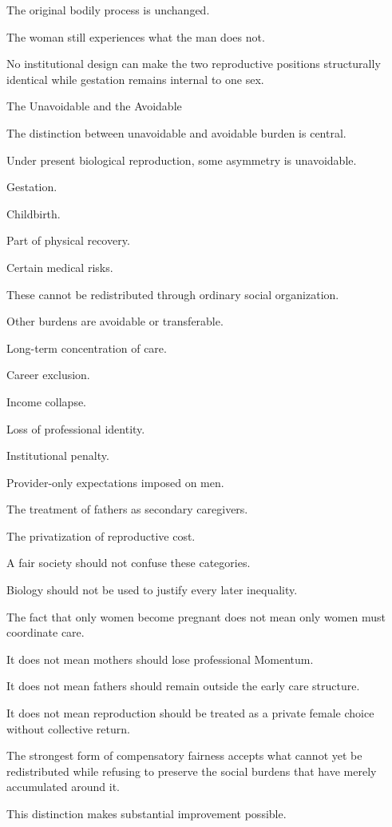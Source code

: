 The original bodily process is unchanged.

The woman still experiences what the man does not.

No institutional design can make the two reproductive positions structurally identical while gestation remains internal to one sex.

The Unavoidable and the Avoidable

The distinction between unavoidable and avoidable burden is central.

Under present biological reproduction, some asymmetry is unavoidable.

Gestation.

Childbirth.

Part of physical recovery.

Certain medical risks.

These cannot be redistributed through ordinary social organization.

Other burdens are avoidable or transferable.

Long-term concentration of care.

Career exclusion.

Income collapse.

Loss of professional identity.

Institutional penalty.

Provider-only expectations imposed on men.

The treatment of fathers as secondary caregivers.

The privatization of reproductive cost.

A fair society should not confuse these categories.

Biology should not be used to justify every later inequality.

The fact that only women become pregnant does not mean only women must coordinate care.

It does not mean mothers should lose professional Momentum.

It does not mean fathers should remain outside the early care structure.

It does not mean reproduction should be treated as a private female choice without collective return.

The strongest form of compensatory fairness accepts what cannot yet be redistributed while refusing to preserve the social burdens that have merely accumulated around it.

This distinction makes substantial improvement possible.

